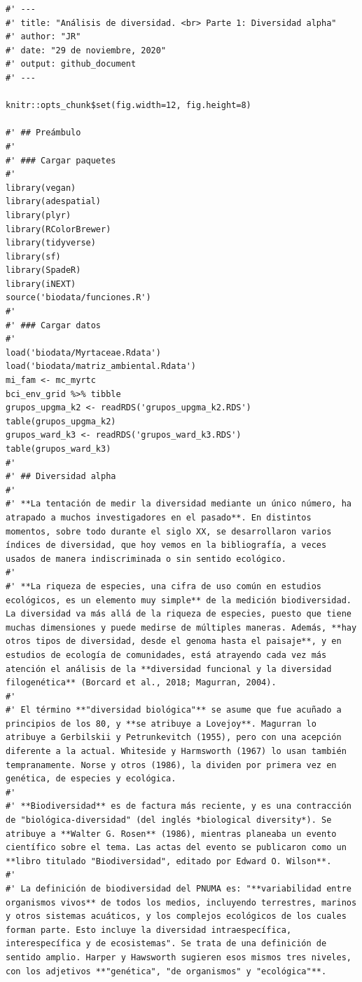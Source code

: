 \documentclass[11pt,]{article}
\begin{document}
\begin{verbatim}
#' ---
#' title: "Análisis de diversidad. <br> Parte 1: Diversidad alpha"
#' author: "JR"
#' date: "29 de noviembre, 2020"
#' output: github_document
#' ---

knitr::opts_chunk$set(fig.width=12, fig.height=8)

#' ## Preámbulo
#' 
#' ### Cargar paquetes
#' 
library(vegan)
library(adespatial)
library(plyr)
library(RColorBrewer)
library(tidyverse)
library(sf)
library(SpadeR)
library(iNEXT)
source('biodata/funciones.R')
#' 
#' ### Cargar datos
#' 
load('biodata/Myrtaceae.Rdata')
load('biodata/matriz_ambiental.Rdata')
mi_fam <- mc_myrtc
bci_env_grid %>% tibble
grupos_upgma_k2 <- readRDS('grupos_upgma_k2.RDS')
table(grupos_upgma_k2)
grupos_ward_k3 <- readRDS('grupos_ward_k3.RDS')
table(grupos_ward_k3)
#' 
#' ## Diversidad alpha
#' 
#' **La tentación de medir la diversidad mediante un único número, ha atrapado a muchos investigadores en el pasado**. En distintos momentos, sobre todo durante el siglo XX, se desarrollaron varios índices de diversidad, que hoy vemos en la bibliografía, a veces usados de manera indiscriminada o sin sentido ecológico.
#' 
#' **La riqueza de especies, una cifra de uso común en estudios ecológicos, es un elemento muy simple** de la medición biodiversidad. La diversidad va más allá de la riqueza de especies, puesto que tiene muchas dimensiones y puede medirse de múltiples maneras. Además, **hay otros tipos de diversidad, desde el genoma hasta el paisaje**, y en estudios de ecología de comunidades, está atrayendo cada vez más atención el análisis de la **diversidad funcional y la diversidad filogenética** (Borcard et al., 2018; Magurran, 2004).
#' 
#' El término **"diversidad biológica"** se asume que fue acuñado a principios de los 80, y **se atribuye a Lovejoy**. Magurran lo atribuye a Gerbilskii y Petrunkevitch (1955), pero con una acepción diferente a la actual. Whiteside y Harmsworth (1967) lo usan también tempranamente. Norse y otros (1986), la dividen por primera vez en genética, de especies y ecológica.
#' 
#' **Biodiversidad** es de factura más reciente, y es una contracción de "biológica-diversidad" (del inglés *biological diversity*). Se atribuye a **Walter G. Rosen** (1986), mientras planeaba un evento científico sobre el tema. Las actas del evento se publicaron como un **libro titulado "Biodiversidad", editado por Edward O. Wilson**.
#' 
#' La definición de biodiversidad del PNUMA es: "**variabilidad entre organismos vivos** de todos los medios, incluyendo terrestres, marinos y otros sistemas acuáticos, y los complejos ecológicos de los cuales forman parte. Esto incluye la diversidad intraespecífica, interespecífica y de ecosistemas". Se trata de una definición de sentido amplio. Harper y Hawsworth sugieren esos mismos tres niveles, con los adjetivos **"genética", "de organismos" y "ecológica"**.

\end{verbatim}
\end{document}
